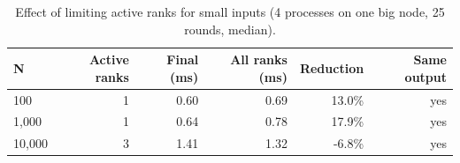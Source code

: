 \begin{table}[htbp]
\centering
\caption{Effect of limiting active ranks for small inputs (4 processes on one big node, 25 rounds, median).}
\label{tab:opt-active}
\begin{tabular}{lrrrrr}
\toprule
N & Active ranks & Final (ms) & All ranks (ms) & Reduction & Same output \\
\midrule
100 & 1 & 0.60 & 0.69 & 13.0\% & yes \\
1,000 & 1 & 0.64 & 0.78 & 17.9\% & yes \\
10,000 & 3 & 1.41 & 1.32 & -6.8\% & yes \\
\bottomrule
\end{tabular}
\end{table}
